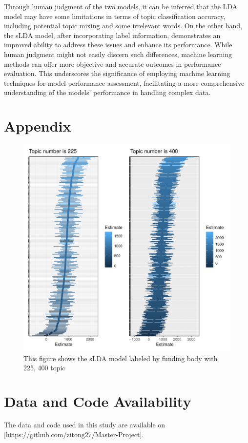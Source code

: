 \documentclass[12pt,twoside]{article}
\begin{document}
Through human judgment of the two models, it can be inferred that the LDA model may have some limitations in terms of topic classification accuracy, including potential topic mixing and some irrelevant words. On the other hand, the sLDA model, after incorporating label information, demonstrates an improved ability to address these issues and enhance its performance. While human judgment might not easily discern such differences, machine learning methods can offer more objective and accurate outcomes in performance evaluation. This underscores the significance of employing machine learning techniques for model performance assessment, facilitating a more comprehensive understanding of the models' performance in handling complex data.


\newpage
\section{Appendix}
\begin{figure}[h]
    \centering
    \includegraphics[width=15cm]{./figures/Durslda225&400}
    \caption{This figure shows the sLDA model labeled by funding body with 225, 400 topic }
    \label{fig:appendix A}
\end{figure}

\section{Data and Code Availability}
The data and code used in this study are available on [https://github.com/zitong27/Master-Project]. 

\newpage
{}

\end{document}
